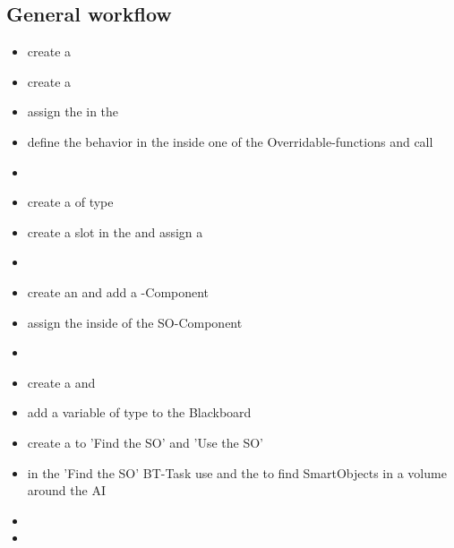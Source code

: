         \subsection{General workflow}
            \begin{itemize}
                \item create a 
                \item create a 
                \item assign the  in the 
                \item define the behavior in the  inside one of the Overridable-functions and call 
                \item 
                \item create a  of type 
                \item create a slot in the  and assign a 
                \item 
                \item create an  and add a -Component
                \item assign the  inside of the SO-Component
                \item 
                \item create a  and 
                \item add a variable of type  to the Blackboard
                \item create a  to 'Find the SO' and 'Use the SO'
                \item in the 'Find the SO' BT-Task use  and the  to find SmartObjects in a volume around the AI
                \item 
                \item 
            \end{itemize}


